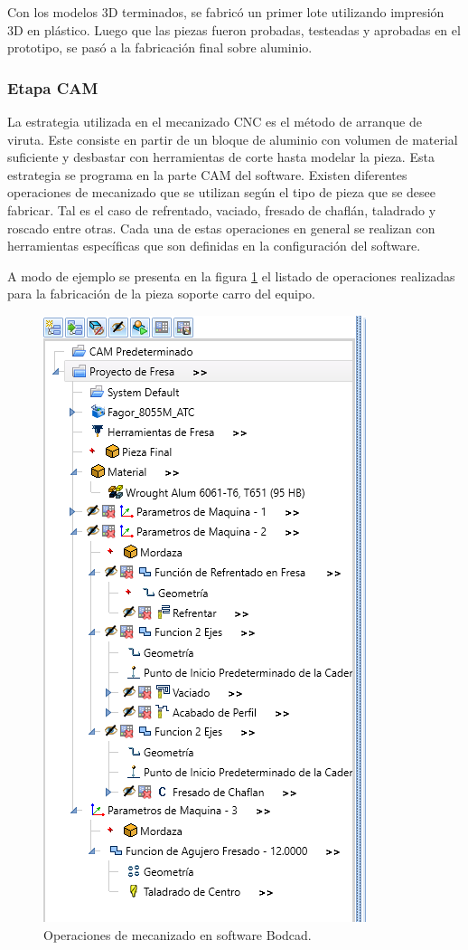 Con los modelos 3D terminados, se fabricó un primer lote utilizando impresión 3D en plástico.
Luego que las piezas fueron probadas, testeadas y aprobadas en el prototipo, se pasó a la fabricación final sobre aluminio.

\subsubsection{Etapa CAM}

La estrategia utilizada en el mecanizado CNC es el método de arranque de viruta. Este consiste en partir de un bloque de aluminio con volumen de material suficiente y desbastar con herramientas de corte hasta modelar la pieza. Esta estrategia se programa en la parte CAM del software. Existen diferentes operaciones de mecanizado que se utilizan según el tipo de pieza que se desee fabricar. Tal es el caso de refrentado, vaciado, fresado de chaflán, taladrado y roscado entre otras. Cada una de estas operaciones  en general se realizan con herramientas específicas que son definidas en la configuración del software.

A modo de ejemplo se presenta en la figura \ref{fig:estrategia} el listado de operaciones realizadas para la fabricación de la pieza soporte carro del equipo.

\begin{figure}[h]
	\centering
	\includegraphics[width=.55\textwidth]{./Figures/3d_estrategia.png}
	\caption{Operaciones de mecanizado en software Bodcad.}
	\label{fig:estrategia}
\end{figure}

